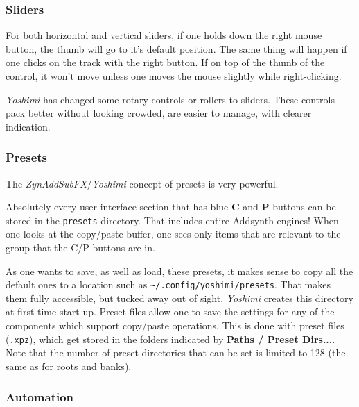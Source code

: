 \subsubsection{Sliders}
\label{subsubsec:stock_settings_elements_sliders}

   For both horizontal and vertical sliders, if one holds down the right mouse
   button, the thumb will go to it's default position.  The same thing will
   happen if one clicks on the track with the right button.  If on top of the
   thumb of the control, it won't move unless one moves the mouse slightly
   while right-clicking.

   \textsl{Yoshimi} has changed some rotary controls or rollers to sliders.
   These controls pack better without looking crowded, are easier to manage,
   with clearer indication.

\subsubsection{Presets}
\label{subsubsec:stock_settings_elements_presets}

   The \textsl{ZynAddSubFX}/\textsl{Yoshimi} concept of presets is very
   powerful.

   Absolutely every user-interface section that has blue \textbf{C}
   and \textbf{P} buttons can be
   stored in the \texttt{presets} directory. That includes entire Addsynth
   engines! When one looks at the copy/paste buffer, one sees only items that
   are relevant to the group that the C/P buttons are in.

   As one wants to save, as well as load, these presets, it makes sense to copy
   all the default ones to a location such as
   \texttt{\textasciitilde/.config/yoshimi/presets}.
   That makes them fully accessible, but
   tucked away out of sight.  \textsl{Yoshimi} creates this directory at first
   time start up.
   Preset files allow one to save the
   settings for any of the components which support copy/paste operations.
   This is done with preset files (\texttt{.xpz}), which get stored in the
   folders indicated by \textbf{Paths / Preset Dirs...}.
   Note that the number of preset directories that can be set is limited to 128
   (the same as for roots and banks).

\subsubsection{Automation}
\label{subsubsec:stock_settings_elements_automation}

